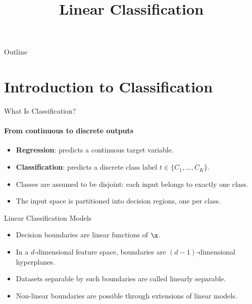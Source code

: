 \title[Linear Classification]{Linear Classification}


%

\begin{frame}
  \titlepage
\end{frame}

\begin{frame}{Outline}
  \tableofcontents
\end{frame}

\section{Introduction to Classification}

\begin{frame}{What Is Classification?}
  \framesubtitle{From continuous to discrete outputs}
  \begin{itemize}
    \item \textbf{Regression}: predicts a continuous target variable.
    \item \textbf{Classification}: predicts a \alert{discrete class label} $t \in \{C_1,\ldots,C_K\}$.
    \item Classes are assumed to be \alert{disjoint}: each input belongs to exactly one class.
    \item The input space is partitioned into \alert{decision regions}, one per class.
  \end{itemize}
\end{frame}

\begin{frame}{Linear Classification Models}
  \begin{itemize}
    \item Decision boundaries are \alert{linear functions} of $\x$.
    \item In a $d$-dimensional feature space, boundaries are $(d-1)$-dimensional \alert{hyperplanes}.
    \item Datasets separable by such boundaries are called \alert{linearly separable}.
    \item Non-linear boundaries are possible through \alert{extensions} of linear models.
  \end{itemize}
\end{frame}

